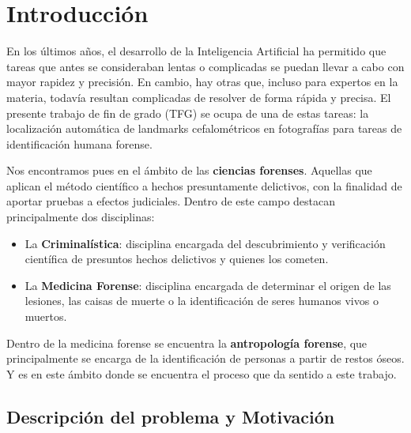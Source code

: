 
\chapter{Introducción}  \label{ch:Introduccion_informatica}

\noindent En los últimos años, el desarrollo de la Inteligencia Artificial \cite{norvig2002modern} ha permitido que tareas que antes se consideraban lentas o complicadas se puedan llevar a cabo con mayor rapidez y precisión. En cambio, hay otras que, incluso para expertos en la materia, todavía resultan complicadas de resolver de forma rápida y precisa. El presente trabajo de fin de grado (TFG) se ocupa de una de estas tareas: la localización automática de landmarks cefalométricos en fotografías para tareas de identificación humana forense. 

\medskip

\noindent Nos encontramos pues en el ámbito de las \textbf{ciencias forenses}. Aquellas que aplican el método científico a hechos presuntamente delictivos, con la finalidad de aportar pruebas a efectos judiciales. Dentro de este campo destacan principalmente dos disciplinas: 

\begin{itemize}
    \item La \textbf{Criminalística}: disciplina encargada del descubrimiento y verificación científica de presuntos hechos delictivos y quienes los cometen.
    \item La \textbf{Medicina Forense}: disciplina encargada de determinar el origen de las lesiones, las caisas de muerte o la identificación de seres humanos vivos o muertos.
\end{itemize}

\medskip

\noindent Dentro de la medicina forense se encuentra la \textbf{antropología forense}, que principalmente se encarga de la identificación de personas a partir de restos óseos. Y es en este ámbito donde se encuentra el proceso que da sentido a este trabajo. 


\section{Descripción del problema y Motivación}

